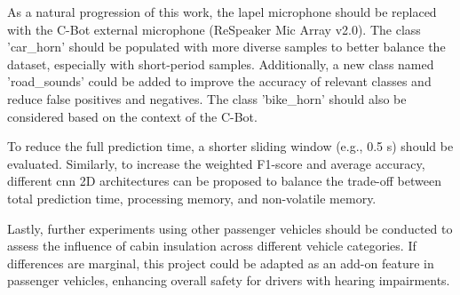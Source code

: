 As a natural progression of this work, the lapel microphone should be replaced with the C-Bot external microphone (ReSpeaker Mic Array v2.0). The class 'car\_horn' should be populated with more diverse samples to better balance the dataset, especially with short-period samples. Additionally, a new class named 'road\_sounds' could be added to improve the accuracy of relevant classes and reduce false positives and negatives. The class 'bike\_horn' should also be considered based on the context of the C-Bot.

To reduce the full prediction time, a shorter sliding window (e.g., 0.5 \gls{s}) should be evaluated. Similarly, to increase the weighted F1-score and average accuracy, different \gls{cnn} 2D architectures can be proposed to balance the trade-off between total prediction time, processing memory, and non-volatile memory.

Lastly, further experiments using other passenger vehicles should be conducted to assess the influence of cabin insulation across different vehicle categories. If differences are marginal, this project could be adapted as an add-on feature in passenger vehicles, enhancing overall safety for drivers with hearing impairments.
